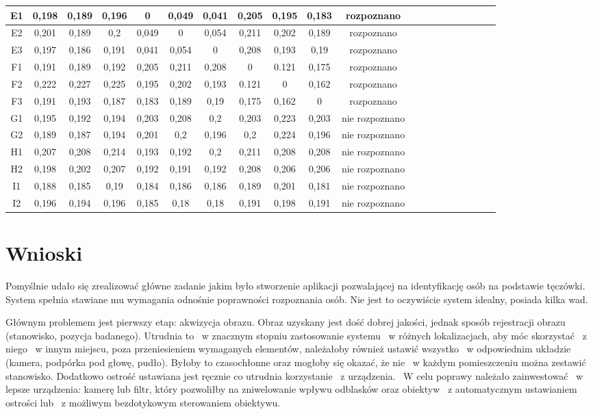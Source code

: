 \begin{table}
\begin{center}
\begin{tabular}{|c|c|c|c|c|c|c|c|c|c|c|c|c|c|c|c|c|c|c|l|}
E1 & 0,198&0,189&0,196&0&0,049&0,041&0,205&0,195&0,183 & rozpoznano\\ \hline
E2 & 0,201&0,189&0,2&0,049&0&0,054&0,211&0,202&0,189 & rozpoznano\\ \hline
E3 & 0,197&0,186&0,191&0,041&0,054&0&0,208&0,193&0,19 & rozpoznano\\ \hline
F1 & 0,191&0,189&0,192&0,205&0,211&0,208&0&0.121&0,175 & rozpoznano\\ \hline
F2 & 0,222&0,227&0,225&0,195&0,202&0,193&0.121&0&0,162 & rozpoznano\\ \hline
F3 & 0,191&0,193&0,187&0,183&0,189&0,19&0,175&0,162&0 & rozpoznano\\ \hline
G1 & 0,195&0,192&0,194&0,203&0,208&0,2&0,203&0,223&0,203 & nie rozpoznano\\ \hline
G2 & 0,189&0,187&0,194&0,201&0,2&0,196&0,2&0,224&0,196 & nie rozpoznano\\ \hline
H1 & 0,207&0,208&0,214&0,193&0,192&0,2&0,211&0,208&0,208 & nie rozpoznano\\ \hline
H2 & 0,198&0,202&0,207&0,192&0,191&0,192&0,208&0,206&0,206 & nie rozpoznano\\ \hline
I1 & 0,188&0,185&0,19&0,184&0,186&0,186&0,189&0,201&0,181 & nie rozpoznano\\ \hline
I2 & 0,196&0,194&0,196&0,185&0,18&0,18&0,191&0,198&0,191 & nie rozpoznano\\ \hline
\end{tabular}
\end{center}
\end{table}

\section{Wnioski}
\label{sec:wnioski}

Pomyślnie udało się zrealizować główne zadanie jakim było stworzenie aplikacji pozwalającej na identyfikację osób na podstawie tęczówki. System spełnia stawiane mu wymagania odnośnie poprawności rozpoznania osób. Nie jest to oczywiście system idealny, posiada kilka wad.

Głównym problemem jest pierwszy etap: akwizycja obrazu. Obraz uzyskany jest dość dobrej jakości, jednak sposób rejestracji obrazu (stanowisko, pozycja badanego). Utrudnia to ~w znacznym stopniu zastosowanie systemu ~w różnych lokalizacjach, aby móc skorzystać ~z niego ~w innym miejscu, poza przeniesieniem wymaganych elementów, należałoby również ustawić wszystko ~w odpowiednim układzie (kamera, podpórka pod głowę, pudło). Byłoby to czasochłonne oraz mogłoby się okazać, że nie ~w każdym pomieszczeniu można zestawić stanowisko. Dodatkowo ostrość ustawiana jest ręcznie co utrudnia korzystanie ~z urządzenia. ~W celu poprawy należało zainwestować ~w lepsze urządzenia: kamerę lub filtr, który pozwoliłby na zniwelowanie wpływu odblasków oraz obiektyw ~z automatycznym ustawianiem ostrości lub ~z możliwym bezdotykowym sterowaniem obiektywu.


